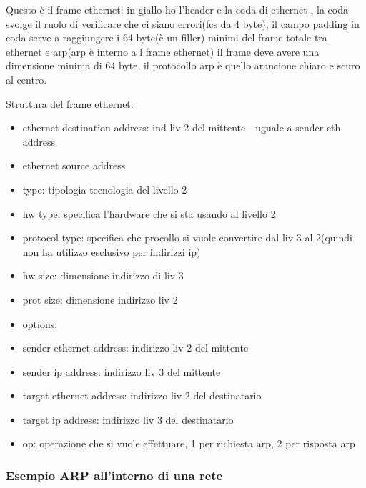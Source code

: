 Questo è il frame ethernet: 
in giallo ho l'header e la coda di ethernet , la coda svolge il ruolo di verificare che ci siano errori(fcs da 4 byte), il campo padding in coda serve a raggiungere i 64 byte(è un filler) minimi del frame totale tra ethernet e arp(arp è interno a l frame ethernet)
il frame deve avere una dimensione minima di 64 byte, il protocollo arp è quello arancione chiaro e scuro al centro.

Struttura del frame ethernet:
\begin{multicols}{2}
\begin{itemize}
    \item ethernet destination address: ind liv 2 del mittente - uguale a sender eth address
    \item ethernet source address
    \item type: tipologia tecnologia del livello 2
    \item hw type: specifica l'hardware che si sta usando al livello 2
    \item protocol type: specifica che procollo si vuole convertire dal liv 3 al 2(quindi non ha utilizzo esclusivo per indirizzi ip)
    \item hw size: dimensione indirizzo di liv 3
    \item prot size: dimensione indirizzo liv 2
    \item options:
    \item sender ethernet address: indirizzo liv 2 del mittente
    \item sender ip address: indirizzo liv 3 del mittente
    \item target ethernet address: indirizzo liv 2 del destinatario
    \item target ip address: indirizzo liv 3 del destinatario
    \item op: operazione che si vuole effettuare, 1 per richiesta arp, 2 per risposta arp
\end{itemize}
\end{multicols}

\subsubsection{Esempio ARP all'interno di una rete}

